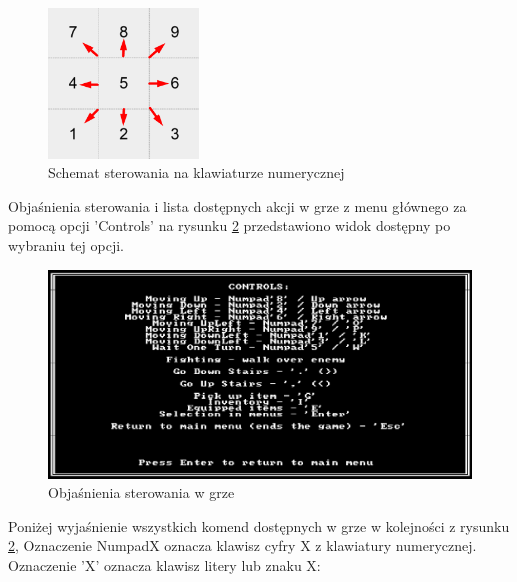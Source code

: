 \documentclass[12pt,twoside]{article}
\begin{document}
\FloatBarrier
\begin{figure}[h]
	\centering
	\includegraphics[width=4cm]{images/custom/numpad_controls.png}
	\caption{Schemat sterowania na klawiaturze numerycznej}
	\label{numpad_controls}
\end{figure}
\FloatBarrier

Objaśnienia sterowania i lista dostępnych akcji w grze z menu głównego za pomocą opcji 'Controls' na rysunku \ref{mygame:scr2} przedstawiono widok dostępny po wybraniu tej opcji.

\FloatBarrier
\begin{figure}[h]
	\centering
	\includegraphics[width=16cm]{images/mygame/scr2.png}
	\caption{Objaśnienia sterowania w grze}
	\label{mygame:scr2}
\end{figure}
\FloatBarrier



Poniżej wyjaśnienie wszystkich komend dostępnych w grze w kolejności z rysunku \ref{mygame:scr2}, Oznaczenie NumpadX oznacza klawisz cyfry X z klawiatury numerycznej. Oznaczenie 'X' oznacza klawisz litery lub znaku X:
\end{document}
